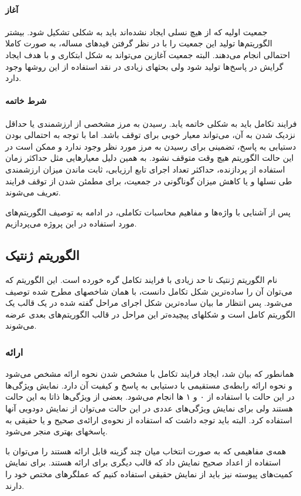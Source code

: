 \documentclass{report}
\begin{document}
\paragraph{آغاز}
جمعیت اولیه که از هیچ نسلی ایجاد نشده‌اند باید به شکلی تشکیل شود. بیشتر الگوریتم‌ها تولید این جمعیت را با در نظر گرفتن قیدهای مساله، به صورت کاملا احتمالی انجام می‌دهند. البته جمعیت آغازین می‌تواند به شکل ابتکاری و با هدف ایجاد گرایش در پاسخ‌ها تولید شود ولی بحثهای زیادی در نقد استفاده از این روشها وجود دارد.

\paragraph{شرط خاتمه}
فرایند تکامل باید به شکلی خاتمه یابد. رسیدن به مرز مشخصی از ارزشمندی یا حداقل نزدیک شدن به آن، می‌تواند معیار خوبی برای توقف باشد. اما با توجه به احتمالی بودن دستیابی به پاسخ، تضمینی برای رسیدن به مرز مورد نظر وجود ندارد و ممکن است در این حالت الگوریتم هیچ وقت متوقف نشود. به همین دلیل معیارهایی مثل حداکثر زمان استفاده از پردازنده، حداکثر تعداد اجرای تابع ارزیابی، ثابت ماندن میزان ارزشمندی طی نسلها و یا کاهش میزان گوناگونی در جمعیت، برای مطمئن شدن از توقف فرایند تعریف می‌شوند. 

پس از آشنایی با واژه‌ها و مفاهیم محاسبات تکاملی، در ادامه به توصیف الگوریتم‌های مورد استفاده در این پروژه می‌پردازیم.

\subsection{الگوریتم ژنتیک}
نام الگوریتم ژنتیک تا حد زیادی با فرایند تکامل گره خورده است. این الگوریتم که می‌توان آن را ساده‌ترین شکل تکامل دانست، با همان شاخصهای مطرح شده توصیف می‌شود. پس انتظار ما بیان ساده‌ترین شکل اجرای مراحل گفته شده در یک قالب یک الگوریتم کامل است و شکلهای پیچیده‌تر این مراحل در قالب الگوریتم‌های بعدی عرضه می‌شوند.

\subsubsection{ارائه}
همانطور که بیان شد، ایجاد فرایند تکامل با مشخص شدن نحوه ارائه مشخص می‌شود و نحوه ارائه رابطه‌ی مستقیمی با دستیابی به پاسخ و کیفیت آن دارد. نمایش ویژگی‌ها در این حالت با استفاده از ۰ و ۱ ها انجام می‌شود. بعضی از ویژگی‌ها ذاتا به این حالت هستند ولی برای نمایش ویژگی‌های عددی در این حالت می‌توان از نمایش دودویی آنها استفاده کرد. البته باید توجه داشت که استفاده از نحوه‌ی ارائه‌ی صحیح و یا حقیقی به پاسخهای بهتری منجر می‌شود.

همه‌ی مفاهیمی که به صورت انتخاب میان چند گزینه قابل ارائه هستند را می‌توان با استفاده از اعداد صحیح نمایش داد که قالب دیگری برای ارائه هستند. برای نمایش کمیت‌های پیوسته نیز باید از نمایش حقیقی استفاده کنیم که عملگرهای مختص خود را دارند.
\end{document}
